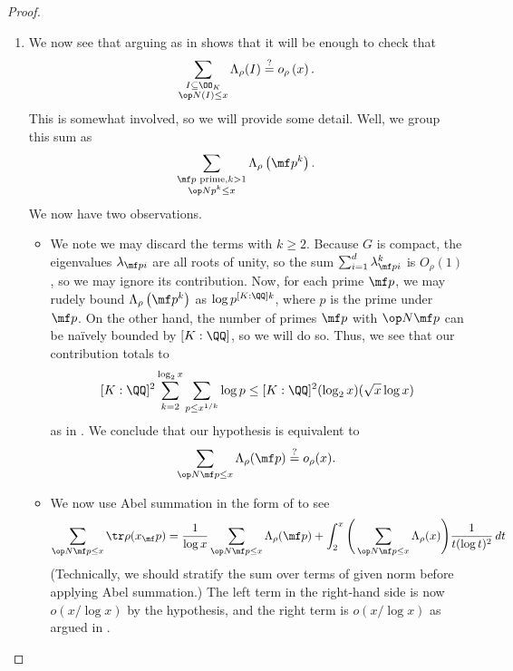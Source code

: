\documentclass[../thesis.tex]{subfiles}
\begin{document}
\begin{proof}
\begin{enumerate}
		\item We now see that arguing as in  shows that it will be enough to check that
		\[\sum_{\substack{I\subseteq\OO_K\\\op N(I)\le x}}\Lambda_\rho(I)\stackrel?=o_\rho\left(x\right).\]
		This is somewhat involved, so we will provide some detail. Well, we group this sum as
		\[\sum_{\substack{\mf p\text{ prime},k>1\\\op Np^k\le x}}\Lambda_\rho\left(\mf p^k\right).\]
		We now have two observations.
		\begin{itemize}
			\item We note we may discard the terms with $k\ge2$. Because $G$ is compact, the eigenvalues $\lambda_{\mf pi}$ are all roots of unity, so the sum $\sum_{i=1}^d\lambda_{\mf pi}^k$ is $O_\rho(1)$, so we may ignore its contribution. Now, for each prime $\mf p$, we may rudely bound $\Lambda_\rho\left(\mf p^k\right)$ as $\log p^{[K:\QQ]k}$, where $p$ is the prime under $\mf p$. On the other hand, the number of primes $\mf p$ with $\op N\mf p$ can be na\"ively bounded by $[K:\QQ]$, so we will do so. Thus, we see that our contribution totals to
			\[\]
			\[[K:\QQ]^2\sum_{k=2}^{\log_2x}\sum_{p\le x^{1/k}}\log p\le[K:\QQ]^2(\log_2x)(\sqrt x\log x)\]
			as in . We conclude that our hypothesis is equivalent to
			\[\sum_{\op N\mf p\le x}\Lambda_\rho(\mf p)\stackrel?=o_\rho(x).\]
			\item We now use Abel summation in the form of  to see
			\[\sum_{\op N\mf p\le x}\tr\rho(x_\mf p)=\frac1{\log x}\sum_{\op N\mf p\le x}\Lambda_\rho(\mf p)+\int_2^x\Bigg(\sum_{\op N\mf p\le x}\Lambda_\rho(x)\Bigg)\frac1{t(\log t)^2}\,dt\]
			(Technically, we should stratify the sum over terms of given norm before applying Abel summation.) The left term in the right-hand side is now $o(x/\log x)$ by the hypothesis, and the right term is $o(x/\log x)$ as argued in .
		\end{itemize}


\end{enumerate}
\end{proof}
\end{document}
